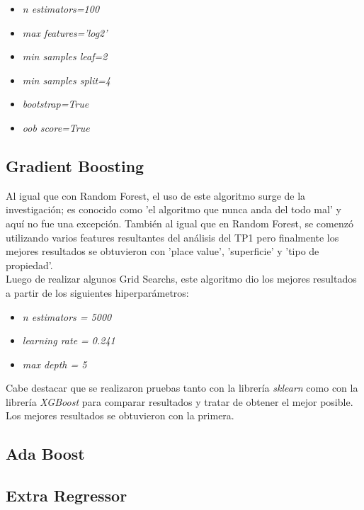 \documentclass[a4paper, 10pt]{article}
\newcommand\tab[1][0.5cm]{\hspace*{#1}}
\begin{document}
		\begin{itemize}
		
		\item \emph{n estimators=100}
			
		\item \emph{max features='log2'}

		\item \emph{min samples leaf=2}
		
		\item \emph{min samples split=4}
		
		\item \emph{bootstrap=True}
		
		\item \emph{oob score=True} 
			
		\end{itemize}
		
		\subsection{Gradient Boosting}
			Al igual que con Random Forest, el uso de este algoritmo surge de la investigación; es conocido como 'el algoritmo que nunca anda
			del todo mal' y aquí no fue una excepción. También al igual que en Random Forest, se comenzó utilizando varios features resultantes
			del análisis del TP1 pero finalmente los mejores resultados se obtuvieron con 'place value', 'superficie' y 'tipo de propiedad'. \\
			\tab Luego de realizar algunos Grid Searchs, este algoritmo dio los mejores resultados a partir de los siguientes hiperparámetros:
			\begin{itemize}
				\item \emph{n estimators = 5000}
				\item \emph{learning rate = 0.241}
				\item \emph{max depth = 5} 
			\end{itemize}
			\tab Cabe destacar que se realizaron pruebas tanto con la librería \emph{sklearn} como con la librería \emph{XGBoost} para comparar
			resultados y tratar de obtener el mejor posible. Los mejores resultados se obtuvieron con la primera.
		\subsection{Ada Boost}
		\subsection{Extra Regressor}
\end{document}
